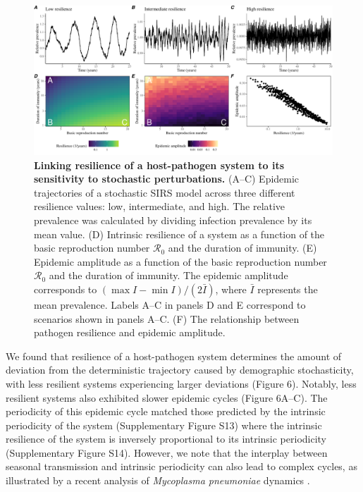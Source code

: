 \documentclass[12pt]{article}
\begin{document}
\begin{figure}[!th]
\begin{center}
\includegraphics[width=\textwidth]{../figure6/figure_persistence_noise.pdf}
\caption{
\textbf{Linking resilience of a host-pathogen system to its sensitivity to stochastic perturbations.}
(A--C) Epidemic trajectories of a stochastic SIRS model across three different resilience values: low, intermediate, and high.
The relative prevalence was calculated by dividing infection prevalence by its mean value.
(D) Intrinsic resilience of a system as a function of the basic reproduction number $\mathcal R_0$ and the duration of immunity.
(E) Epidemic amplitude as a function of the basic reproduction number $\mathcal R_0$ and the duration of immunity.
The epidemic amplitude corresponds to $(\max I - \min I)/(2 \bar{I})$, where $\bar{I}$ represents the mean prevalence.
Labels A--C in panels D and E correspond to scenarios shown in panels A--C.
(F) The relationship between pathogen resilience and epidemic amplitude.
}
\end{center}
\end{figure}

We found that resilience of a host-pathogen system determines the amount of deviation from the deterministic trajectory caused by demographic stochasticity, with less resilient systems experiencing larger deviations (Figure 6).
Notably, less resilient systems also exhibited slower epidemic cycles (Figure 6A--C). 
The periodicity of this epidemic cycle matched those predicted by the intrinsic periodicity of the system (Supplementary Figure S13) where the intrinsic resilience of the system is inversely proportional to its intrinsic periodicity (Supplementary Figure S14).
However, we note that the interplay between seasonal transmission and intrinsic periodicity can also lead to complex cycles, as illustrated by a recent analysis of \textit{Mycoplasma pneumoniae} dynamics \citep{nielsen2025complex}.
\end{document}
